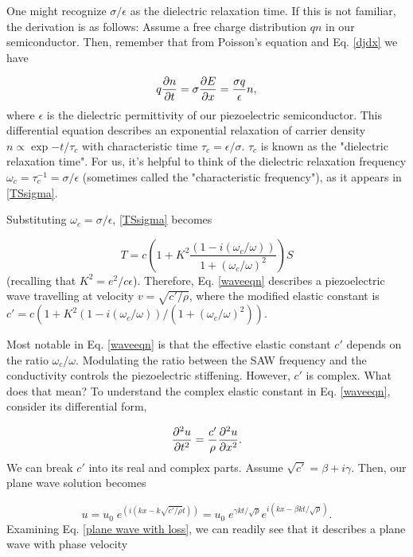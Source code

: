 \documentclass[double,12pt,1in]{beavtex}
\begin{document}
One might recognize $\sigma/\epsilon$ as the dielectric relaxation time. If this is not familiar, the derivation is as follows: Assume a free charge distribution $qn$ in our semiconductor. Then, remember that from Poisson's equation and Eq. \ref{djdx} we have

\begin{equation}
    q\pdv{n}{t} = \sigma\pdv{E}{x} = \frac{\sigma q}{\epsilon}n, 
\end{equation}
where $\epsilon$ is the dielectric permittivity of our piezoelectric semiconductor. This differential equation describes an exponential relaxation of carrier density $n \propto \exp{-t/\tau_c}$ with characteristic time $\tau_c = \epsilon/\sigma$. $\tau_c$ is known as the "dielectric relaxation time". For us, it's helpful to think of the dielectric relaxation frequency $\omega_c = \tau_c^{-1} = \sigma/\epsilon$ (sometimes called the "characteristic frequency"), as it appears in \ref{TSsigma}. 

Substituting $\omega_c = \sigma/\epsilon$, \ref{TSsigma} becomes

\begin{equation}
    T = c(1 + K^2\frac{(1-i(\omega_c/\omega))}{1+(\omega_c/\omega)^2})S \label{waveeqn}
\end{equation}
(recalling that $K^2 = e^2/c\epsilon$). Therefore, Eq. \ref{waveeqn} describes a piezoelectric wave travelling at velocity $v = \sqrt{c'/\rho}$, where the modified elastic constant is $c' = c(1 + K^2(1-i(\omega_c/\omega))/(1+(\omega_c/\omega)^2))$.

Most notable in Eq. \ref{waveeqn} is that the effective elastic constant $c'$ depends on the ratio $\omega_c/\omega$. Modulating the ratio between the SAW frequency and the conductivity controls the piezoelectric stiffening. However, $c'$ is complex. What does that mean? To understand the complex elastic constant in Eq. \ref{waveeqn}, consider its differential form,

\begin{equation}
    \pdv[2]{u}{t} = \frac{c'}{\rho} \pdv[2]{u}{x}.
\end{equation}
We can break $c'$ into its real and complex parts. Assume $\sqrt{c'} = \beta + i\gamma$. Then, our plane wave solution becomes

\begin{equation}
    u = u_0 \; e^{(i(kx-k\sqrt{c'/\rho}t))}
    = u_0 \; e^{\gamma kt/\sqrt{\rho}}e^{i(kx - \beta kt/\sqrt{\rho})}. \label{plane wave with loss}
\end{equation}
Examining Eq. \ref{plane wave with loss}, we can readily see that it describes a plane wave with phase velocity 
\end{document}
